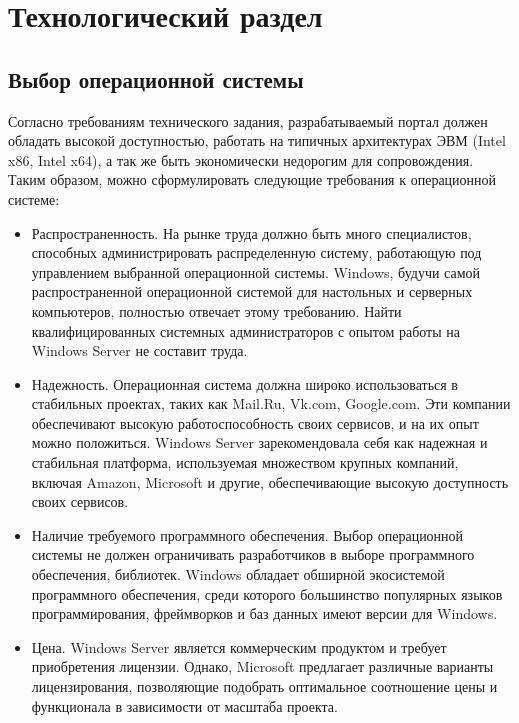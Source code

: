 \chapter{Технологический раздел}

\section{Выбор операционной системы}

Согласно требованиям технического задания, разрабатываемый портал должен обладать высокой доступностью, работать на типичных архитектурах ЭВМ (Intel x86, Intel x64), а так же быть экономически недорогим для сопровождения. Таким образом, можно сформулировать следующие требования к операционной системе:

\begin{itemize}
	\item Распространенность. На рынке труда должно быть много специалистов, способных администрировать распределенную систему, работающую под управлением выбранной операционной системы. Windows, будучи самой распространенной операционной системой для настольных и серверных компьютеров, полностью отвечает этому требованию. Найти квалифицированных системных администраторов с опытом работы на Windows Server не составит труда.
	
	\item Надежность. Операционная система должна широко использоваться в стабильных проектах, таких как Mail.Ru, Vk.com, Google.com. Эти компании обеспечивают высокую работоспособность своих сервисов, и на их опыт можно положиться. Windows Server зарекомендовала себя как надежная и стабильная платформа, используемая множеством крупных компаний, включая Amazon, Microsoft и другие, обеспечивающие высокую доступность своих сервисов.
	
	\item Наличие требуемого программного обеспечения. Выбор операционной системы не должен ограничивать разработчиков в выборе программного обеспечения, библиотек. Windows обладает обширной экосистемой программного обеспечения, среди которого большинство популярных языков программирования, фреймворков и баз данных имеют версии для Windows.
	
	\item Цена. Windows Server является коммерческим продуктом и требует приобретения лицензии. Однако, Microsoft предлагает различные варианты лицензирования, позволяющие подобрать оптимальное соотношение цены и функционала в зависимости от масштаба проекта. 
\end{itemize}

